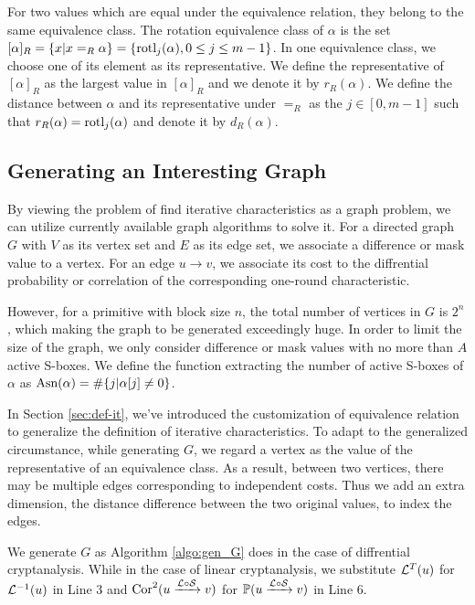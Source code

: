 For two values which are equal under the equivalence relation, they belong to the same equivalence class. The rotation equivalence class of $\alpha$ is the set $[\alpha]_R=\{x|x=_R\alpha\}=\{\text{rotl}_j(\alpha),0\leq j\leq m-1\}$. In one equivalence class, we choose one of its element as its representative. We define the representative of $[\alpha]_R$ as the largest value in $[\alpha]_R$ and we denote it by $r_R(\alpha)$. We define the distance between $\alpha$ and its representative under $=_R$ as the $j\in[0,m-1]$ such that $r_R(\alpha)=\text{rotl}_j(\alpha)$ and denote it by $d_R(\alpha)$. 

\subsection{Generating an Interesting Graph}

By viewing the problem of find iterative characteristics as a graph problem, we can utilize currently available graph algorithms to solve it. For a directed graph $G$ with $V$ as its vertex set and $E$ as its edge set, we associate a difference or mask value to a vertex. For an edge $u\rightarrow v$, we associate its cost to the diffrential probability or correlation of the corresponding one-round characteristic.

However, for a primitive with block size $n$, the total number of vertices in $G$ is $2^n$, which making the graph to be generated exceedingly huge. In order to limit the size of the graph, we only consider difference or mask values with no more than $A$ active S-boxes. We define the function extracting the number of active S-boxes of $\alpha$ as $\text{Asn}(\alpha)=\#\{j|\alpha[j]\neq 0\}$. 

In Section \ref{sec:def-it}, we've introduced the customization of equivalence relation to generalize the definition of iterative characteristics. To adapt to the generalized circumstance, while generating $G$, we regard a vertex as the value of the representative of an equivalence class. As a result, between two vertices, there may be multiple edges corresponding to independent costs. Thus we add an extra dimension, the distance difference between the two original values, to index the edges. 

We generate $G$ as Algorithm \ref{algo:gen_G} does in the case of diffrential cryptanalysis. While in the case of linear cryptanalysis, we substitute $\mathcal{L}^{T}(u)$ for $\mathcal{L}^{-1}(u)$ in Line 3 and $\text{Cor}^2(u\xrightarrow{\mathcal{L}\circ\mathcal{S}}v)$ for $\mathbb{P}(u\xrightarrow{\mathcal{L}\circ\mathcal{S}}v)$ in Line 6. 

